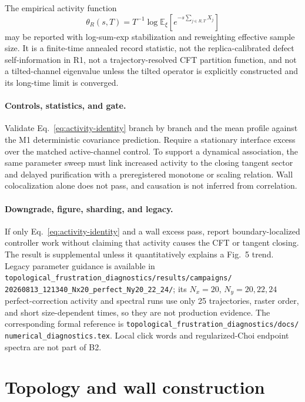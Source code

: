 \documentclass[aps,prx,onecolumn,nofootinbib,superscriptaddress,longbibliography]{revtex4-2}
\newcommand{\E}{\mathbb{E}}
\newcommand{\code}[1]{\texttt{#1}}
\begin{document}
The empirical activity function
\begin{equation}
 \theta_R(s,T)=T^{-1}\log\E_\xi[e^{-s\sum_{j\in R,T}X_j}]
\end{equation}
may be reported with log-sum-exp stabilization and reweighting effective sample size.  It
is a finite-time annealed record statistic, not the replica-calibrated defect self-information in R1, not
a trajectory-resolved CFT partition function, and not a tilted-channel eigenvalue unless the
tilted operator is explicitly constructed and its long-time limit is converged.

\paragraph{Controls, statistics, and gate.}
Validate Eq.~\eqref{eq:activity-identity} branch by branch and the mean profile against the
M1 deterministic covariance prediction.  Require a stationary interface excess over the
matched active-channel control.  To support a dynamical association, the same parameter
sweep must link increased activity to the closing tangent sector and delayed purification
with a preregistered monotone or scaling relation.  Wall colocalization alone does not
pass, and causation is not inferred from correlation.

\paragraph{Downgrade, figure, sharding, and legacy.}
If only Eq.~\eqref{eq:activity-identity} and a wall excess pass, report boundary-localized
controller work without claiming that activity causes the CFT or tangent closing.  The
result is supplemental unless it quantitatively explains a Fig.~5 trend.
Legacy parameter guidance is available in
\code{topological\_frustration\_diagnostics/results/campaigns/
20260813\_121340\_Nx20\_perfect\_Ny20\_22\_24/}; its $N_x=20$, $N_y=20,22,24$
perfect-correction activity and spectral runs use only 25 trajectories, raster order, and
short size-dependent times, so they are not production evidence.  The corresponding
formal reference is \code{topological\_frustration\_diagnostics/docs/
numerical\_diagnostics.tex}.  Local click words and regularized-Choi endpoint spectra are
not part of B2.

\section{Topology and wall construction}
\end{document}

